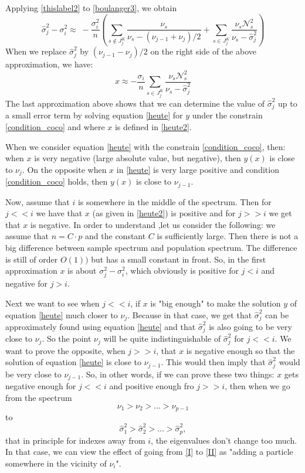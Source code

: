 \documentclass[12pt]{amsart}
\theoremstyle{definition}
\numberwithin{equation}{section}
\numberwithin{equation}{section}
\theoremstyle{remark}
\numberwithin{equation}{section}
\begin{document}
Applying \ref{thislabel2} to \ref{boulanger3}, we obtain
\begin{equation}
\label{boulanger4}
\hat{\sigma}^2_j-\sigma^2_i\approx \; -\frac{\sigma^2_i}{n}
\left(\sum_{s\notin J^K_j} \frac{\nu_s}{\nu_s-(\nu_{j-1}+\nu_{j})/2}
+\sum_{s\in J^K_j} \frac{\nu_s\mathcal{N}^2_{s}}{\nu_s-\hat{\sigma}^2_j}
\right)
\end{equation}
When we replace $\hat{\sigma}_j^2$ by $(\nu_{j-1}-\nu_j)/2$ on the right side of the above approximation, we have:
$$ x\approx-
\frac{\sigma_i}{n}\sum_{s\in J^K_j} \frac{\nu_s\mathcal{N}^2_{s}}{\nu_s-\hat{\sigma}_j^2}$$
The last approximation above shows that we can determine the value of $\hat{\sigma}^2_j$ up to a small error term by solving equation \ref{heute} for $y$ under the constrain \ref{condition_coco} and where $x$ is defined in \ref{heute2}.

When we consider equation \ref{heute} with the constrain \ref{condition_coco}, then: when $x$ is very negative (large absolute value, but negative), then $y(x)$ is close to $\nu_{j}$. On the opposite when $x$  in \ref{heute} is very large positive and condition \ref{condition_coco} holds, then $y(x)$ is close to $\nu_{j-1}$.

Now, assume that $i$ is somewhere in the middle of the spectrum. Then for $j<<i$ we have that $x$
(as given in \ref{heute2}) is positive
and for $j>>i$ we get that $x$ is negative. In order to understand ,let us consider the following: we assume that $n=C\cdot p$ and the constant $C$ is sufficiently
large. Then there is not a big difference between sample spectrum and population spectrum. The difference is still of order
$O(1))$ but has a small constant in front. So, in the first approximation $x$ is about $\sigma^2_j-\sigma^2_i$, which obviously is positive for $j<i$ and negative for $j>i$. 

Next we want to see when $j<<i$, if $x$ is "big enough" to make the solution $y$ of equation \ref{heute} much closer to $\nu_{j}$. Because in that case, we get that $\hat{\sigma}^2_j$ can be approximately found using equation \ref{heute} and that $\hat{\sigma}^2_j$ is also going to be very close to $\nu_{j}$.
So the point $\nu_j$ will be quite indistinguishable of
$\hat{\sigma}^2_j$ for $j<<i$. We want to prove the opposite, when $j>>i$, that $x$ is negative enough so that the solution of equation \ref{heute} is close to $\nu_{j-1}$. This would then imply that $\hat{\sigma}^2_j$ would be very close
to $\nu_{j-1}$. So, in other words, if we can prove these two things: $x$ gets negative enough for $j<<i$ and positive enough fro $j>>i$,
then when we go from the spectrum
\begin{equation}
\label{I}\nu_1>\nu_2>\ldots>\nu_{p-1}
\end{equation}
to
\begin{equation}
\label{II}
\hat{\sigma}^2_1>\hat{\sigma}^2_2>\ldots>\hat{\sigma}^2_p,
\end{equation}
that in principle  for indexes away from $i$, the eigenvalues don't change too much.
In that case, we can view the effect of going from \ref{I} to \ref{II}
as "adding a particle somewhere in the vicinity of $\nu_i$".
\end{document}

